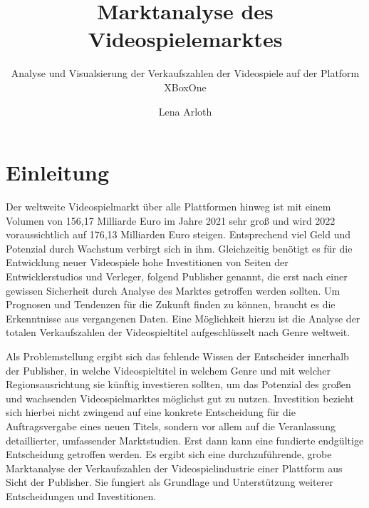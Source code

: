 \documentclass[usegeometry=true]{scrartcl}
\begin{document}
\subject{Projektbericht zum Modul Information Retrieval und Visualisierung Sommersemester 2022}
\title{Marktanalyse des Videospielemarktes}
\subtitle{Analyse und Visualsierung der Verkaufszahlen der Videospiele auf der Platform XBoxOne}
\author{Lena Arloth}%
\maketitle%
\newpage
\tableofcontents
\newpage
\section{Einleitung}
Der weltweite Videospielmarkt über alle Plattformen hinweg ist mit einem Volumen von 156,17 Milliarde Euro im Jahre 2021 sehr groß und wird 2022 voraussichtlich auf 176,13 Milliarden Euro steigen.\cite{Statista.2022b}
Entsprechend viel Geld und Potenzial durch Wachstum verbirgt sich in ihm.
Gleichzeitig benötigt es für die Entwicklung neuer Videospiele hohe Investitionen von Seiten der Entwicklerstudios und Verleger, folgend Publisher genannt, die erst nach einer gewissen Sicherheit durch Analyse des Marktes getroffen werden sollten.
Um Prognosen und Tendenzen für die Zukunft finden zu können, braucht es die Erkenntnisse aus vergangenen Daten.
Eine Möglichkeit hierzu ist die Analyse der totalen Verkaufszahlen der Videospieltitel aufgeschlüsselt nach Genre weltweit.

Als Problemstellung ergibt sich das fehlende Wissen der Entscheider innerhalb der Publisher, in welche Videospieltitel in welchem Genre und mit welcher Regionsausrichtung sie künftig investieren sollten, um das Potenzial des großen und wachsenden Videospielmarktes möglichst gut zu nutzen.
Investition bezieht sich hierbei nicht zwingend auf eine konkrete Entscheidung für die Auftragsvergabe eines neuen Titels, sondern vor allem auf die Veranlassung detaillierter, umfassender Marktstudien.
Erst dann kann eine fundierte endgültige Entscheidung getroffen werden.
Es ergibt sich eine durchzuführende, grobe Marktanalyse der Verkaufszahlen der Videospielindustrie einer Plattform aus Sicht der Publisher.
Sie fungiert als Grundlage und Unterstützung weiterer Entscheidungen und Investitionen.
\end{document}
